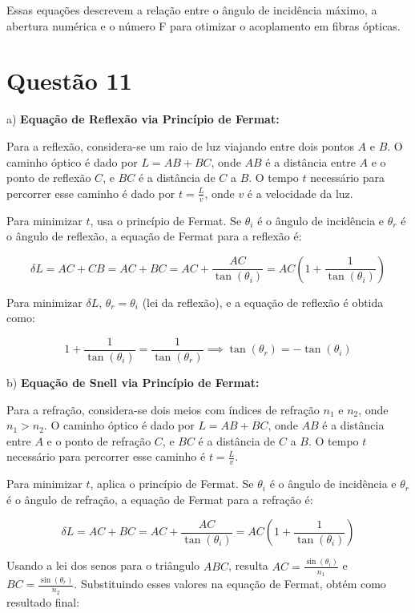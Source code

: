 \documentclass[a4paper, 12pt]{article}
\begin{document}
Essas equações descrevem a relação entre o ângulo de incidência máximo, a abertura numérica e o número F para otimizar o acoplamento em fibras ópticas.


\section*{Questão 11}

a) \textbf{Equação de Reflexão via Princípio de Fermat:}

Para a reflexão, considera-se um raio de luz viajando entre dois pontos \(A\) e \(B\). O caminho óptico é dado por \(L = AB + BC\), onde \(AB\) é a distância entre \(A\) e o ponto de reflexão \(C\), e \(BC\) é a distância de \(C\) a \(B\). O tempo \(t\) necessário para percorrer esse caminho é dado por \(t = \frac{L}{v}\), onde \(v\) é a velocidade da luz. 

Para minimizar \(t\), usa o princípio de Fermat. Se \(\theta_i\) é o ângulo de incidência e \(\theta_r\) é o ângulo de reflexão, a equação de Fermat para a reflexão é:

\[
\delta L = AC + CB = AC + BC = AC + \frac{AC}{\tan(\theta_i)} = AC \left(1 + \frac{1}{\tan(\theta_i)}\right)
\]

Para minimizar \(\delta L\), \(\theta_r = \theta_i\) (lei da reflexão), e a equação de reflexão é obtida como:

\[
1 + \frac{1}{\tan(\theta_i)} = \frac{1}{\tan(\theta_r)} \implies \tan(\theta_r) = -\tan(\theta_i)
\]

b) \textbf{Equação de Snell via Princípio de Fermat:}

Para a refração, considera-se dois meios com índices de refração \(n_1\) e \(n_2\), onde \(n_1 > n_2\). O caminho óptico é dado por \(L = AB + BC\), onde \(AB\) é a distância entre \(A\) e o ponto de refração \(C\), e \(BC\) é a distância de \(C\) a \(B\). O tempo \(t\) necessário para percorrer esse caminho é \(t = \frac{L}{v}\).

Para minimizar \(t\), aplica o princípio de Fermat. Se \(\theta_i\) é o ângulo de incidência e \(\theta_r\) é o ângulo de refração, a equação de Fermat para a refração é:

\[
\delta L = AC + BC = AC + \frac{AC}{\tan(\theta_i)} = AC \left(1 + \frac{1}{\tan(\theta_i)}\right)
\]

Usando a lei dos senos para o triângulo \(ABC\), resulta \(AC = \frac{\sin(\theta_i)}{n_1}\) e \(BC = \frac{\sin(\theta_r)}{n_2}\). Substituindo esses valores na equação de Fermat, obtém como resultado final:
\end{document}
